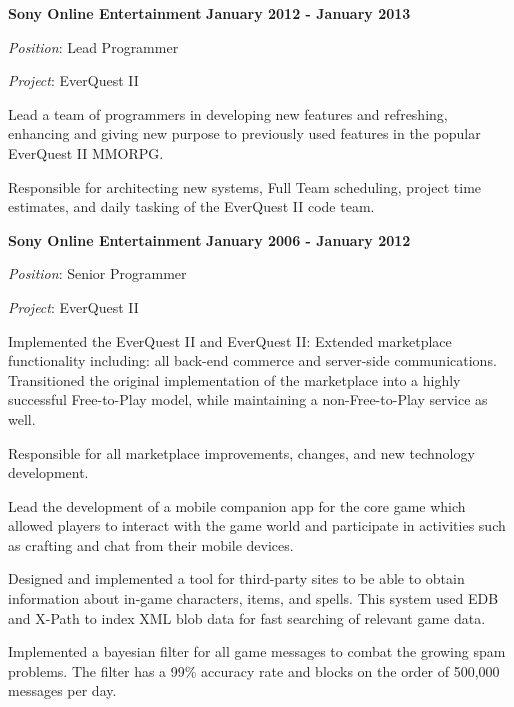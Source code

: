 \documentclass{article}
\begin{document}
\vspace{\baselineskip}
{\bf Sony Online Entertainment}
\hfill {\bf January 2012 - January 2013}
\vspace{.03in}
\par
{\it Position}: Lead Programmer
\par
{\it Project}: EverQuest II
\vspace{\baselineskip}
\par
Lead a team of programmers in developing new features and
refreshing, enhancing and giving new purpose to previously used features in
the popular EverQuest II MMORPG. 
\par
Responsible for architecting new systems, Full Team
scheduling, project time estimates, and daily tasking of the EverQuest II code team.
\par
\vspace{\baselineskip}
{\bf Sony Online Entertainment} 
\hfill {\bf January 2006 - January 2012} 
\par
\vspace{.03in}
{\it Position}: Senior Programmer
\par
{\it Project}: EverQuest II
\vspace{\baselineskip}
\par
Implemented the EverQuest II and EverQuest II: Extended marketplace functionality
including: all back-end commerce and server-side communications.  Transitioned
the original implementation of the marketplace into a highly successful Free-to-Play 
model, while maintaining a non-Free-to-Play service as well.
\vspace{\baselineskip}
\par
Responsible for all marketplace improvements, changes, and new technology development. 
\vspace{\baselineskip}
\par
Lead the development of a mobile companion app for the core game which allowed players to interact with the game world and participate in activities such as crafting and chat from their mobile devices. 
\par
\vspace{\baselineskip}
Designed and implemented a tool for third-party sites to be able to obtain
information about in-game characters, items, and spells.  This system used 
EDB and X-Path to index XML blob data for fast searching of relevant game data.
\par

\vspace{\baselineskip}
Implemented a bayesian filter for all game messages to combat the growing spam
problems.  The filter has a 99\% accuracy rate and blocks on the order of
500,000 messages per day.
\par
\end{document}
